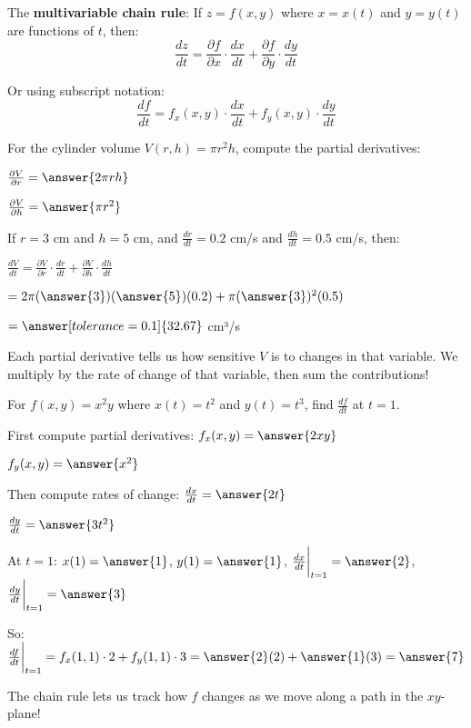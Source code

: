 \documentclass{ximera}
\begin{document}
\begin{definition}
The \textbf{multivariable chain rule}: If $z = f(x, y)$ where $x = x(t)$ and $y = y(t)$ are functions of $t$, then:
$$\frac{dz}{dt}=\frac{\partial f}{\partial x}\cdot \frac{dx}{dt}+\frac{\partial f}{\partial y}\cdot \frac{dy}{dt}$$

Or using subscript notation:
$$\frac{df}{dt}=f_x(x,y)\cdot \frac{dx}{dt}+f_y(x,y)\cdot \frac{dy}{dt}$$
\end{definition}

\begin{problem}
For the cylinder volume $V(r, h) = \pi r^2 h$, compute the partial derivatives:

$\frac{\partial V}{\partial r} = \answer{2\pi rh}$

$\frac{\partial V}{\partial h} = \answer{\pi r^2}$

If $r = 3$ cm and $h = 5$ cm, and $\frac{dr}{dt} = 0.2$ cm/s and $\frac{dh}{dt} = 0.5$ cm/s, then:

$\frac{dV}{dt} = \frac{\partial V}{\partial r}\cdot \frac{dr}{dt}+\frac{\partial V}{\partial h}\cdot \frac{dh}{dt}$

$= 2\pi(\answer{3})(\answer{5})(0.2) + \pi(\answer{3})^2(0.5)$

$= \answer[tolerance=0.1]{32.67}$ cm³/s

\begin{feedback}
Each partial derivative tells us how sensitive $V$ is to changes in that variable. We multiply by the rate of change of that variable, then sum the contributions!
\end{feedback}
\end{problem}

\begin{problem}
For $f(x, y) = x^2y$ where $x(t) = t^2$ and $y(t) = t^3$, find $\frac{df}{dt}$ at $t = 1$.

First compute partial derivatives:
$f_x(x, y) = \answer{2xy}$

$f_y(x, y) = \answer{x^2}$

Then compute rates of change:
$\frac{dx}{dt} = \answer{2t}$

$\frac{dy}{dt} = \answer{3t^2}$

At $t = 1$: $x(1) = \answer{1}$, $y(1) = \answer{1}$, $\frac{dx}{dt}\bigg|_{t=1} = \answer{2}$, $\frac{dy}{dt}\bigg|_{t=1} = \answer{3}$

So: $\frac{df}{dt}\bigg|_{t=1} = f_x(1, 1) \cdot 2 + f_y(1, 1) \cdot 3 = \answer{2}(2) + \answer{1}(3) = \answer{7}$

\begin{feedback}
The chain rule lets us track how $f$ changes as we move along a path in the $xy$-plane!
\end{feedback}
\end{problem}
\end{document}
